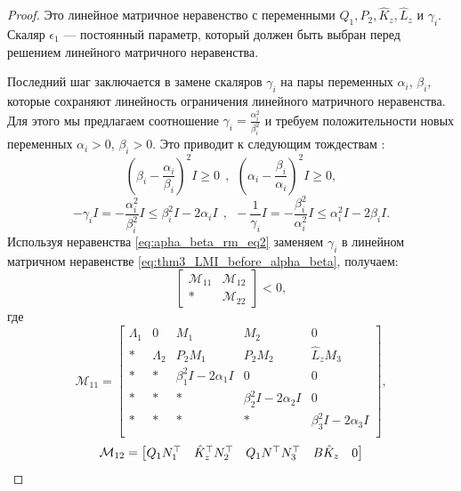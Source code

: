 \begin{proof}
Это линейное матричное неравенство с переменными ${Q}_1, {P}_2, \hat{{K}}_z,\hat{{L}}_z$ и $\gamma_i$. Скаляр $\epsilon_1$ --- постоянный параметр, который должен быть выбран перед решением линейного матричного неравенства.

Последний шаг заключается в замене скаляров $\gamma_i$ на пары переменных $\alpha_i$, $\beta_i$, которые сохраняют линейность ограничения линейного матричного неравенства. Для этого мы предлагаем соотношение $\gamma_i=\frac{\alpha_i^2}{\beta_i^2}$ и требуем положительности новых переменных $\alpha_i>0$, $\beta_i>0$. Это приводит к следующим тождествам \cite{KHELOUFI2016}:
%
\begin{equation}
	\label{eq:apha_beta_rm_eq1}
	\left(\beta_i-\frac{\alpha_i}{\beta_i}\right)^2 {I} \geq 0 \ \ , \ \  \left(\alpha_i-\frac{\beta_i}{\alpha_i}\right)^2 {I} \geq 0,
\end{equation}
%
\begin{equation}
	\label{eq:apha_beta_rm_eq2}
	-\gamma_i {I} = -\frac{\alpha_i^2}{\beta_i^2}{I} \leq \beta_i^2{I}-2\alpha_i {I} \ \ , \ \  -\frac{1}{\gamma_i} {I} = -\frac{\beta_i^2}{\alpha_i^2}{I} \leq \alpha_i^2{I}-2\beta_i {I} .
\end{equation}
Используя неравенства \eqref{eq:apha_beta_rm_eq2} заменяем $\gamma_i$ в линейном матричном неравенстве \eqref{eq:thm3_LMI_before_alpha_beta}, получаем: 
\begin{equation}
	\label{eq:thm3_final_LMI_before_schur}
	\begin{bmatrix}
		\mathcal{M}_{11} & \mathcal{M}_{12} \\
		* & \mathcal{M}_{22}
	\end{bmatrix}<0,
\end{equation}
где
\begin{equation}
	\mathcal{M}_{11}= \begin{bmatrix}
	{\Lambda}_1 & 0 & {M}_1 & {M}_2&0  \\
		* & {\Lambda}_2 & {P}_2{M}_1 & {P}_2{M}_2 & \hat{{L}}_z{M}_3\\
		* & * & \beta_1^2{I}-2\alpha_1 {I} & 0&0\\
		* & * &*  & \beta_2^2{I}-2\alpha_2 {I}&0\\
		*& * & * &*  &\beta_3^2{I}-2\alpha_3 {I}\\
	\end{bmatrix},
\end{equation}
%
\begin{equation}
	\mathcal{M}_{12}= \begin{bmatrix}
		{Q}_1{N}_1^\top & \hat{{K}}_z^\top{N}_2^\top & {Q}_1 {N}^\top{N}_3^\top & {B}\hat{{K}}_z & 0\\

\end{bmatrix}
\end{equation}
\end{proof}
